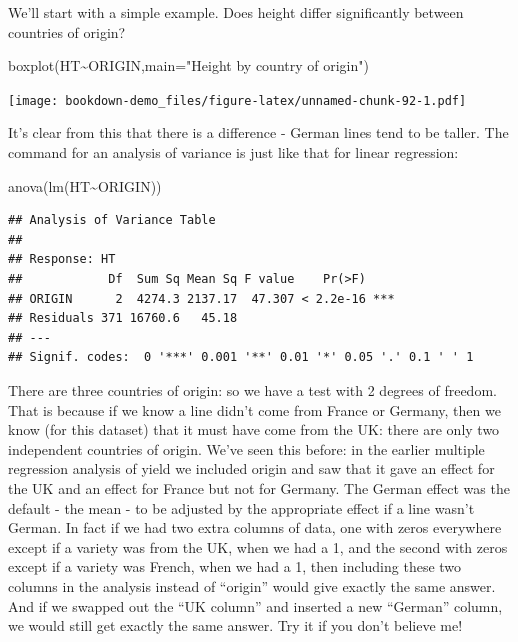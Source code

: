 \documentclass[
]{book}
\newenvironment{Shaded}{\begin{snugshade}}{\end{snugshade}}
\newcommand{\AttributeTok}[1]{\textcolor[rgb]{0.77,0.63,0.00}{#1}}
\newcommand{\FunctionTok}[1]{\textcolor[rgb]{0.00,0.00,0.00}{#1}}
\newcommand{\NormalTok}[1]{#1}
\newcommand{\SpecialCharTok}[1]{\textcolor[rgb]{0.00,0.00,0.00}{#1}}
\newcommand{\StringTok}[1]{\textcolor[rgb]{0.31,0.60,0.02}{#1}}
\begin{document}
We'll start with a simple example. Does height differ significantly between countries of origin?

\begin{Shaded}
\begin{Highlighting}[]
\FunctionTok{boxplot}\NormalTok{(HT}\SpecialCharTok{\textasciitilde{}}\NormalTok{ORIGIN,}\AttributeTok{main=}\StringTok{"Height by country of origin"}\NormalTok{)}
\end{Highlighting}
\end{Shaded}

\texttt{[image: bookdown-demo\_files/figure-latex/unnamed-chunk-92-1.pdf]}

It's clear from this that there is a difference - German lines tend to be taller. The command for an analysis of variance is just like that for linear regression:

\begin{Shaded}
\begin{Highlighting}[]
\FunctionTok{anova}\NormalTok{(}\FunctionTok{lm}\NormalTok{(HT}\SpecialCharTok{\textasciitilde{}}\NormalTok{ORIGIN))}
\end{Highlighting}
\end{Shaded}

\begin{verbatim}
## Analysis of Variance Table
## 
## Response: HT
##            Df  Sum Sq Mean Sq F value    Pr(>F)    
## ORIGIN      2  4274.3 2137.17  47.307 < 2.2e-16 ***
## Residuals 371 16760.6   45.18                      
## ---
## Signif. codes:  0 '***' 0.001 '**' 0.01 '*' 0.05 '.' 0.1 ' ' 1
\end{verbatim}

There are three countries of origin: so we have a test with 2 degrees of freedom. That is because if we know a line didn't come from France or Germany, then we know (for this dataset) that it must have come from the UK: there are only two independent countries of origin. We've seen this before: in the earlier multiple regression analysis of yield we included origin and saw that it gave an effect for the UK and an effect for France but not for Germany. The German effect was the default - the mean - to be adjusted by the appropriate effect if a line wasn't German. In fact if we had two extra columns of data, one with zeros everywhere except if a variety was from the UK, when we had a 1, and the second with zeros except if a variety was French, when we had a 1, then including these two columns in the analysis instead of ``origin'' would give exactly the same answer. And if we swapped out the ``UK column'' and inserted a new ``German'' column, we would still get exactly the same answer. Try it if you don't believe me!
\end{document}
